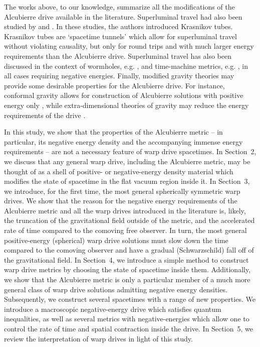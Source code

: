 \documentclass[10pt]{iopart}
\begin{document}
The works above, to our knowledge, summarize all the modifications of the Alcubierre drive available in the literature. Superluminal travel had also been studied by \cite{Krasnikov1998} and \cite{Everett1997}. In these studies, the authors introduced Krasnikov tubes. Krasnikov tubes are `spacetime tunnels' which allow for superluminal travel without violating causality, but only for round trips and with much larger energy requirements than the Alcubierre drive. Superluminal travel has also been discussed in the context of wormholes, e.g. \cite{Garattini2007}, and time-machine metrics, e.g. \cite{Fermi2018}, in all cases requiring negative energies. Finally, modified gravity theories may provide some desirable properties for the Alcubierre drive. For instance, conformal gravity allows for construction of Alcubierre solutions with positive energy only \cite{Varieschi2013}, while extra-dimensional theories of gravity may reduce the energy requirements of the drive \cite{White2013}.


In this study, we show that the properties of the Alcubierre metric -- in particular, its negative energy density and the accompanying immense energy requirements -- are not a necessary feature of warp drive spacetimes. In Section~2, we discuss that any general warp drive, including the Alcubierre metric, may be thought of as a shell of positive- or negative-energy density material which modifies the state of spacetime in the flat vacuum region inside it. In Section~3, we introduce, for the first time, the most general spherically symmetric warp drives. We show that the reason for the negative energy requirements of the Alcubierre metric and all the warp drives introduced in the literature is, likely, the truncation of the gravitational field outside of the metric, and the accelerated rate of time compared to the comoving free observer. In turn, the most general positive-energy (spherical) warp drive solutions must slow down the time compared to the comoving observer and have a gradual (Schwarzschild) fall off of the gravitational field. In Section~4, we introduce a simple method to construct warp drive metrics by choosing the state of spacetime inside them. Additionally, we show that the Alcubierre metric is only a particular member of a much more general class of warp drive solutions admitting negative energy densities. Subsequently, we construct several spacetimes with a range of new properties. We introduce a macroscopic negative-energy drive which satisfies quantum inequalities, as well as several metrics with negative-energies which allow one to control the rate of time and spatial contraction inside the drive. In Section~5, we review the interpretation of warp drives in light of this study.
\end{document}
